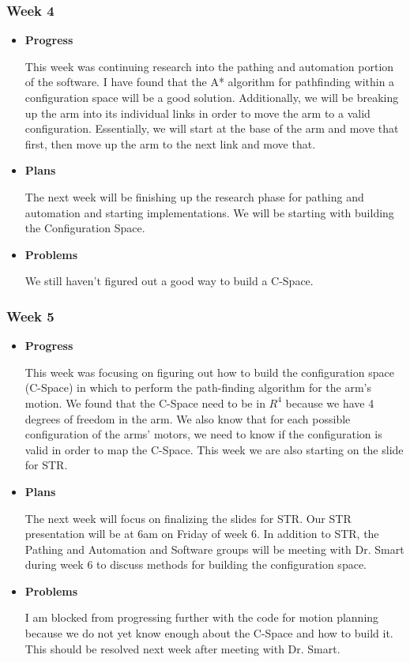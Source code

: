 \subsubsection{Week 4}
\begin{itemize}
\item{
\textbf{Progress}

This week was continuing research into the pathing and automation portion of the software. I have found that the A* algorithm for pathfinding within a configuration space will be a good solution. Additionally, we will be breaking up the arm into its individual links in order to move the arm to a valid configuration. Essentially, we will start at the base of the arm and move that first, then move up the arm to the next link and move that.
}
\item{
\textbf{Plans}

The next week will be finishing up the research phase for pathing and automation and starting implementations. We will be starting with building the Configuration Space.
}
\item{
\textbf{Problems}

We still haven't figured out a good way to build a C-Space.
}
\end{itemize}

\subsubsection{Week 5}
\begin{itemize}
\item{
\textbf{Progress}

		This week was focusing on figuring out how to build the configuration space (C-Space) in which to perform the path-finding algorithm for the arm's motion. We found that the C-Space need to be in \(R^4\) because we have 4 degrees of freedom in the arm. We also know that for each possible configuration of the arms' motors, we need to know if the configuration is valid in order to map the C-Space. This week we are also starting on the slide for STR.
}
\item{
\textbf{Plans}

The next week will focus on finalizing the slides for STR. Our STR presentation will be at 6am on Friday of week 6. In addition to STR, the Pathing and Automation and Software groups will be meeting with Dr. Smart during week 6 to discuss methods for building the configuration space.
}
\item{
\textbf{Problems}

I am blocked from progressing further with the code for motion planning because we do not yet know enough about the C-Space and how to build it. This should be resolved next week after meeting with Dr. Smart.
}
\end{itemize}

